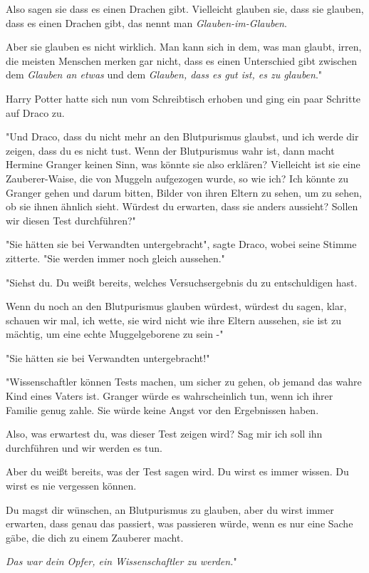 {Also sagen sie dass es einen Drachen gibt. Vielleicht glauben sie, dass sie glauben, dass es einen Drachen gibt, das nennt man \emph{Glauben-im-Glauben}.

Aber sie glauben es nicht wirklich. Man kann sich in dem, was man glaubt, irren, die meisten Menschen merken gar nicht, dass es einen Unterschied gibt zwischen dem \emph{Glauben an etwas} und dem \emph{Glauben, dass es gut ist, es zu glauben}."

Harry Potter hatte sich nun vom Schreibtisch erhoben und ging ein paar Schritte auf Draco zu.

"Und Draco, dass du nicht mehr an den Blutpurismus glaubst, und ich werde dir zeigen, dass du es nicht tust. Wenn der Blutpurismus wahr ist, dann macht Hermine Granger keinen Sinn, was könnte sie also erklären? Vielleicht ist sie eine Zauberer-Waise, die von Muggeln aufgezogen wurde, so wie ich? Ich könnte zu Granger gehen und darum bitten, Bilder von ihren Eltern zu sehen, um zu sehen, ob sie ihnen ähnlich sieht. Würdest du erwarten, dass sie anders aussieht? Sollen wir diesen Test durchführen?"

"Sie hätten sie bei Verwandten untergebracht", sagte Draco, wobei seine Stimme zitterte. "Sie werden immer noch gleich aussehen."

"Siehst du. Du weißt bereits, welches Versuchsergebnis du zu entschuldigen hast.

Wenn du noch an den Blutpurismus glauben würdest, würdest du sagen, klar, schauen wir mal, ich wette, sie wird nicht wie ihre Eltern aussehen, sie ist zu mächtig, um eine echte Muggelgeborene zu sein -"

"Sie hätten sie bei Verwandten untergebracht!"

"Wissenschaftler können Tests machen, um sicher zu gehen, ob jemand das wahre Kind eines Vaters ist. Granger würde es wahrscheinlich tun, wenn ich ihrer Familie genug zahle. Sie würde keine Angst vor den Ergebnissen haben.

Also, was erwartest du, was dieser Test zeigen wird? Sag mir ich soll ihn durchführen und wir werden es tun.

Aber du weißt bereits, was der Test sagen wird. Du wirst es immer wissen. Du wirst es nie vergessen können.

Du magst dir wünschen, an Blutpurismus zu glauben, aber du wirst immer erwarten, dass genau das passiert, was passieren würde, wenn es nur eine Sache gäbe, die dich zu einem Zauberer macht.

\emph{Das war dein Opfer, ein Wissenschaftler zu werden.}"

}
